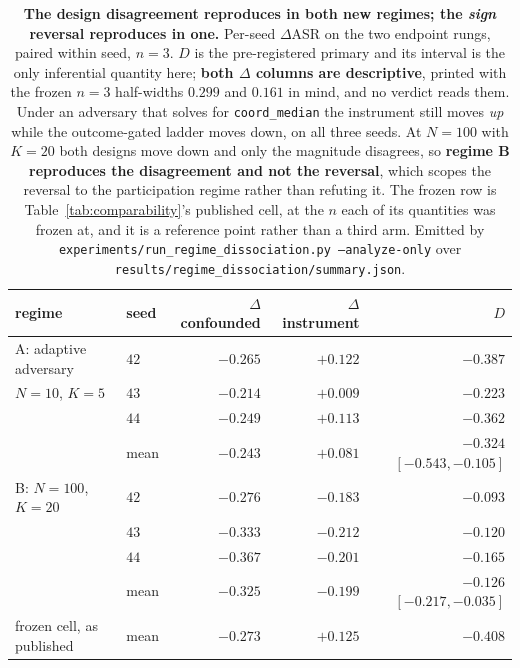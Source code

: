 \documentclass{article}
\begin{document}
\begin{table}[h]
\centering\small\setlength{\tabcolsep}{5pt}
\caption{\textbf{The design disagreement reproduces in both new regimes; the \emph{sign} reversal reproduces in one.} Per-seed $\Delta$ASR on the two endpoint rungs, paired within seed, $n{=}3$. $D$ is the pre-registered primary and its interval is the only inferential quantity here; \textbf{both $\Delta$ columns are descriptive}, printed with the frozen $n{=}3$ half-widths $0.299$ and $0.161$ in mind, and no verdict reads them. Under an adversary that solves for \texttt{coord\_median} the instrument still moves \emph{up} while the outcome-gated ladder moves down, on all three seeds. At $N{=}100$ with $K{=}20$ both designs move down and only the magnitude disagrees, so \textbf{regime B reproduces the disagreement and not the reversal}, which scopes the reversal to the participation regime rather than refuting it. The frozen row is Table~\ref{tab:comparability}'s published cell, at the $n$ each of its quantities was frozen at, and it is a reference point rather than a third arm. Emitted by \texttt{experiments/\allowbreak run\_regime\_dissociation.py --analyze-only} over \texttt{results/\allowbreak regime\_dissociation/\allowbreak summary.json}.}
\label{tab:regime}
\begin{tabular}{@{}llrrr@{}}
\toprule
regime & seed & $\Delta$ confounded & $\Delta$ instrument & $D$ \\
\midrule
A: adaptive adversary & $42$ & $-0.265$ & $+0.122$ & $-0.387$ \\
$N{=}10$, $K{=}5$     & $43$ & $-0.214$ & $+0.009$ & $-0.223$ \\
                      & $44$ & $-0.249$ & $+0.113$ & $-0.362$ \\
                      & mean & $-0.243$ & $+0.081$ & $\mathbf{-0.324}$ $[-0.543,-0.105]$ \\
\midrule
B: $N{=}100$, $K{=}20$ & $42$ & $-0.276$ & $-0.183$ & $-0.093$ \\
                       & $43$ & $-0.333$ & $-0.212$ & $-0.120$ \\
                       & $44$ & $-0.367$ & $-0.201$ & $-0.165$ \\
                       & mean & $-0.325$ & $-0.199$ & $\mathbf{-0.126}$ $[-0.217,-0.035]$ \\
\midrule
frozen cell, as published & mean & $-0.273$ & $+0.125$ & $-0.408$ \\
\bottomrule
\end{tabular}
\end{table}
\end{document}
